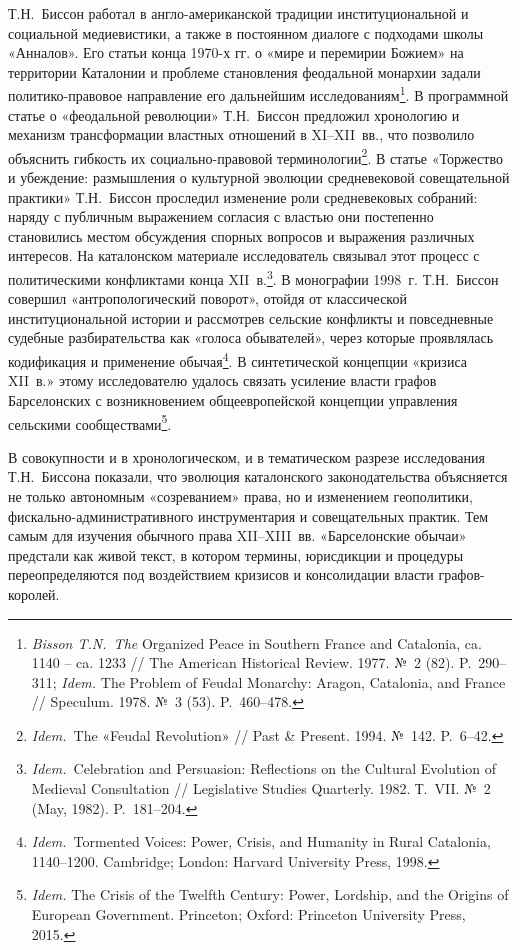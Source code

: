 Т.Н.~Биссон работал в англо-американской традиции институциональной и социальной медиевистики, а также в постоянном диалоге с подходами школы «Анналов». Его статьи конца 1970-х гг. о «мире и перемирии Божием» на территории Каталонии и проблеме становления феодальной монархии задали политико-правовое направление его дальнейшим исследованиям\footnote{\emph{Bisson T.N.~The} Organized Peace in Southern France and Catalonia, ca. 1140 -- ca. 1233 // The American Historical Review. 1977. №~2 (82). P.~290--311; \emph{Idem. }The Problem of Feudal Monarchy: Aragon, Catalonia, and France // Speculum. 1978. №~3 (53). P.~460--478.}. В программной статье о «феодальной революции» Т.Н.~Биссон предложил хронологию и механизм трансформации властных отношений в XI--XII~вв., что позволило объяснить гибкость их социально-правовой терминологии\footnote{\emph{Idem.}~The «Feudal Revolution» // Past \& Present. 1994. №~142. P.~6--42.}.\textbf{ }В статье «Торжество и убеждение: размышления о культурной эволюции средневековой совещательной практики» Т.Н.~Биссон проследил изменение роли средневековых собраний: наряду с публичным выражением согласия с властью они постепенно становились местом обсуждения спорных вопросов и выражения различных интересов. На каталонском материале исследователь связывал этот процесс с политическими конфликтами конца XII~в.\footnote{\emph{Idem.}~Celebration and Persuasion: Reflections on the Cultural Evolution of Medieval Consultation // Legislative Studies Quarterly. 1982. Т.~VII. №~2 (May, 1982). P.~181--204.}. В монографии 1998~г. Т.Н.~Биссон совершил «антропологический поворот», отойдя от классической институциональной истории и рассмотрев сельские конфликты и повседневные судебные разбирательства как «голоса обывателей», через которые проявлялась кодификация и применение обычая\footnote{\emph{Idem.}~Tormented Voices: Power, Crisis, and Humanity in Rural Catalonia, 1140--1200. Cambridge; London: Harvard University Press, 1998.}. В синтетической концепции «кризиса XII~в.» этому исследователю удалось связать усиление власти графов Барселонских с возникновением общеевропейской концепции управления сельскими сообществами\footnote{\emph{Idem.} The Crisis of the Twelfth Century: Power, Lordship, and the Origins of European Government. Princeton; Oxford: Princeton University Press, 2015.}.

В совокупности и в хронологическом, и в тематическом разрезе исследования Т.Н.~Биссона показали, что эволюция каталонского законодательства объясняется не только автономным «созреванием» права, но и изменением геополитики, фискально-административного инструментария и совещательных практик. Тем самым для изучения обычного права XII--XIII~вв. «Барселонские обычаи» предстали как живой текст, в котором термины, юрисдикции и процедуры переопределяются под воздействием кризисов и консолидации власти графов-королей.

